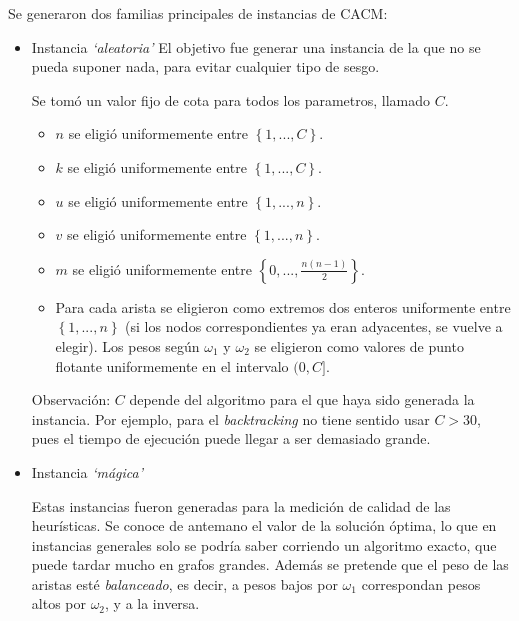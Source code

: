 Se generaron dos familias principales de instancias de CACM:

\begin{itemize}
    \item Instancia \textit{`aleatoria'}
    El objetivo fue generar una instancia de la que no se pueda suponer nada, para evitar cualquier tipo de sesgo.

    Se tomó un valor fijo de cota para todos los parametros, llamado $C$.

    \begin{itemize}
        \item $n$ se eligió uniformemente entre $\left\{{1, ..., C}\right\}$.
        \item $k$ se eligió uniformemente entre $\left\{{1, ..., C}\right\}$.
        \item $u$ se eligió uniformemente entre $\left\{{1, ..., n}\right\}$.
        \item $v$ se eligió uniformemente entre $\left\{{1, ..., n}\right\}$.
        \item $m$ se eligió uniformemente entre $\left\{{0, ..., \frac{n(n-1)}{2}}\right\}$.
        \item Para cada arista se eligieron como extremos dos enteros uniformente entre $\left\{{1, ..., n}\right\}$ (si los nodos correspondientes ya eran adyacentes, se vuelve a elegir). Los pesos según $\omega_1$ y $\omega_2$ se eligieron como valores de punto flotante uniformemente en el intervalo $(0, C]$.
    \end{itemize}
    Observación: $C$ depende del algoritmo para el que haya sido generada la instancia. Por ejemplo, para el \textit{backtracking} no tiene sentido usar $C > 30$, pues el tiempo de ejecución puede llegar a ser demasiado grande.

    \item Instancia \textit{`mágica'}

    Estas instancias fueron generadas para la medición de calidad de las heurísticas. Se conoce de antemano el valor de la solución óptima, lo que en instancias generales solo se podría saber corriendo un algoritmo exacto, que puede tardar mucho en grafos grandes. Además se pretende que el peso de las aristas esté \textit{balanceado}, es decir, a pesos bajos por $\omega_1$ correspondan pesos altos por $\omega_2$, y a la inversa.


\end{itemize}
